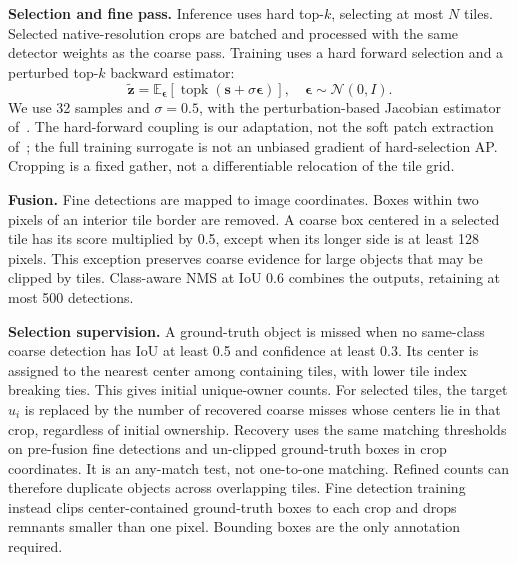 \documentclass[conference]{IEEEtran}
\begin{document}
\textbf{Selection and fine pass.} Inference uses hard top-$k$, selecting at most $N$ tiles. Selected native-resolution crops are batched and processed with the same detector weights as the coarse pass. Training uses a hard forward selection and a perturbed top-$k$ backward estimator:
\begin{equation}
\tilde{\mathbf z}=\mathbb E_{\boldsymbol\epsilon}[\operatorname{topk}(\mathbf s+\sigma\boldsymbol\epsilon)],\quad
\boldsymbol\epsilon\sim\mathcal N(0,I).
\end{equation}
We use 32 samples and $\sigma=0.5$, with the perturbation-based Jacobian estimator of~\cite{berthet2020perturbed,cordonnier2021patch}. The hard-forward coupling is our adaptation, not the soft patch extraction of~\cite{cordonnier2021patch}; the full training surrogate is not an unbiased gradient of hard-selection AP. Cropping is a fixed gather, not a differentiable relocation of the tile grid.

\textbf{Fusion.} Fine detections are mapped to image coordinates. Boxes within two pixels of an interior tile border are removed. A coarse box centered in a selected tile has its score multiplied by 0.5, except when its longer side is at least 128 pixels. This exception preserves coarse evidence for large objects that may be clipped by tiles. Class-aware NMS at IoU 0.6 combines the outputs, retaining at most 500 detections.

\textbf{Selection supervision.} A ground-truth object is missed when no same-class coarse detection has IoU at least 0.5 and confidence at least 0.3. Its center is assigned to the nearest center among containing tiles, with lower tile index breaking ties. This gives initial unique-owner counts. For selected tiles, the target $u_i$ is replaced by the number of recovered coarse misses whose centers lie in that crop, regardless of initial ownership. Recovery uses the same matching thresholds on pre-fusion fine detections and un-clipped ground-truth boxes in crop coordinates. It is an any-match test, not one-to-one matching. Refined counts can therefore duplicate objects across overlapping tiles. Fine detection training instead clips center-contained ground-truth boxes to each crop and drops remnants smaller than one pixel. Bounding boxes are the only annotation required.
\end{document}
